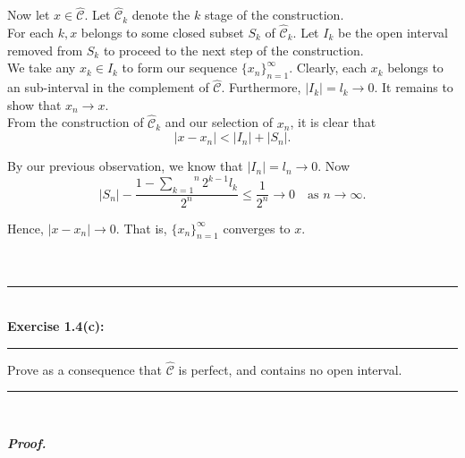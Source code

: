 \documentclass[a4paper,11pt]{article}
\begin{document}
Now let $x \in \hat{\mathcal{C}}$. Let $\hat{\mathcal{C}}_k$ denote the $k$ stage of the construction.\\

For each $k, x$ belongs to some closed subset $S_k$ of $\hat{\mathcal{C}}_k$. Let $I_k$ be the open interval removed from $S_k$ to proceed to the next step of the construction.\\

We take any $x_k \in I_k$ to form our sequence $\{x_n\}_{n = 1}^\infty$. Clearly, each $x_k$ belongs to an sub-interval in the complement of $\hat{\mathcal{C}}$. Furthermore, $|I_k| = l_k \to 0$. It remains to show that $x_n \to x$.\\

From the construction of $\hat{\mathcal{C}}_k$ and our selection of $x_n$, it is clear that
	$$|x - x_n| < |I_n| + |S_n|.$$

By our previous observation, we know that $|I_n| = l_n \to 0$. Now
	$$|S_n| - \frac{1 - \overset{n}{\underset{k = 1}{\sum}} 2^{k-1} l_k}{2^n}
	\leq \frac{1}{2^n} \to 0
	\quad \text{as } n \to \infty.$$

Hence, $|x - x_n| \to 0$. That is, $\{x_n\}_{n=1}^\infty$ converges to $x$.\\\\\\



\begin{flushleft}
	\rule[-0.5ex]{17cm}{2pt}\\
		\textbf{Exercise 1.4(c):}\\
	\rule[1.5ex]{17cm}{0.5pt}
		Prove as a consequence that $\hat{\mathcal{C}}$ is perfect, and contains no open interval.
	\rule[1.0ex]{17cm}{0.5pt}\
\end{flushleft}

\textbf{\textit{Proof.}}
\end{document}
